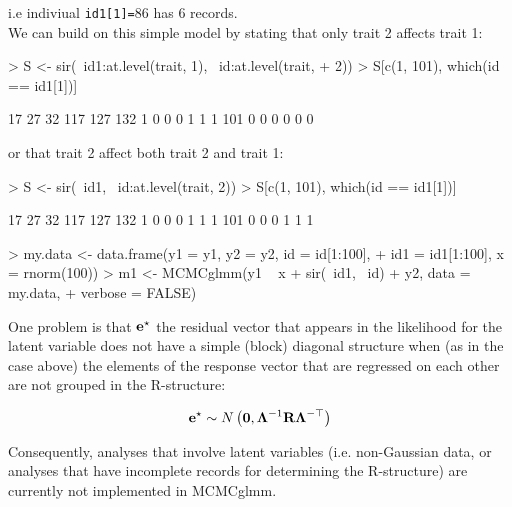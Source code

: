 \documentclass{article}
\begin{document}
i.e indiviual  \texttt{id1[1]=}86 has 6 records.\\

We can build on this simple model by stating that only trait 2 affects trait 1:

\begin{Schunk}
\begin{Sinput}
> S <- sir(~id1:at.level(trait, 1), ~id:at.level(trait, 
+     2))
> S[c(1, 101), which(id == id1[1])]
\end{Sinput}
\begin{Soutput}
    17 27 32 117 127 132
1    0  0  0   1   1   1
101  0  0  0   0   0   0
\end{Soutput}
\end{Schunk}

or that trait 2 affect both trait 2 and trait 1:

\begin{Schunk}
\begin{Sinput}
> S <- sir(~id1, ~id:at.level(trait, 2))
> S[c(1, 101), which(id == id1[1])]
\end{Sinput}
\begin{Soutput}
    17 27 32 117 127 132
1    0  0  0   1   1   1
101  0  0  0   1   1   1
\end{Soutput}
\end{Schunk}


\begin{Schunk}
\begin{Sinput}
> my.data <- data.frame(y1 = y1, y2 = y2, id = id[1:100], 
+     id1 = id1[1:100], x = rnorm(100))
> m1 <- MCMCglmm(y1 ~ x + sir(~id1, ~id) + y2, data = my.data, 
+     verbose = FALSE)
\end{Sinput}
\end{Schunk}

One problem is that ${\bf e}^{\star}$ the residual vector that appears in the likelihood for the latent variable does not have a simple (block) diagonal structure when (as in the case above) the elements of the response vector that are regressed on each other are not grouped in the R-structure:

\begin{equation}
{\bf e}^{\star} \sim N\left({\bm 0}, {\bm \Lambda}^{-1}{\bf R}{\bm \Lambda}^{-\top}\right)
\end{equation}

Consequently, analyses that involve latent variables (i.e. non-Gaussian data, or analyses that have incomplete records for determining the R-structure) are currently not implemented in MCMCglmm.
\end{document}
